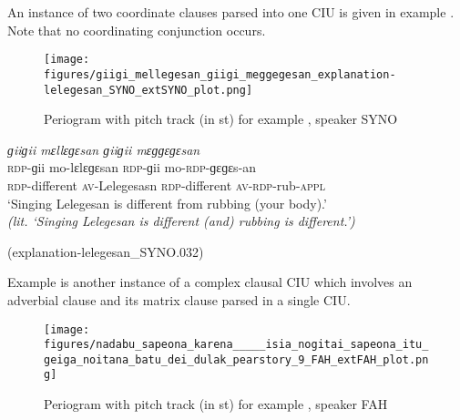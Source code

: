 \z


An instance of  two coordinate clauses parsed into one CIU is given in example  . Note that no coordinating conjunction occurs. 

\begin{figure}
	\texttt{[image: figures/giigi\_mellegesan\_giigi\_meggegesan\_explanation-lelegesan\_SYNO\_extSYNO\_plot.png]}
	\caption{Periogram with pitch track (in st) for example , speaker SYNO}
	\label{pitch:giigii mellegesan giigii meggegesan}
\end{figure}



\ea
\label{ex:giigii mellegesan giigii meggegesan}
\textit{ɡiiɡii mɛllɛɡɛsan ɡiiɡii mɛɡɡɛɡɛsan} \\
\gll \textsc{rdp}-ɡii mo-lɛlɛɡɛsan \textsc{rdp}-ɡii mo-\textsc{rdp}-ɡɛɡɛs-an\\ 
\textsc{rdp}-different \textsc{av}-Lelegesasn \textsc{rdp}-different \textsc{av}-\textsc{rdp}-rub-\textsc{appl}\\
\glt ‘Singing Lelegesan is different from rubbing (your body).’ \\ \textit{(lit. ‘Singing Lelegesan is different (and) rubbing  is different.')} \begin{flushright}(explanation-lelegesan\_SYNO.032)
	\end{flushright}
\z


Example  is another instance of a complex clausal CIU which involves an adverbial clause  and its matrix clause parsed in a single CIU. 

\begin{figure}
	\texttt{[image: figures/nadabu\_sapeona\_karena\_\_\_\_\_isia\_nogitai\_sapeona\_itu\_geiga\_noitana\_batu\_dei\_dulak\_pearstory\_9\_FAH\_extFAH\_plot.png]}
	\caption{Periogram with pitch track (in st) for example , speaker FAH}
	\label{pitch:AdvCl + Simple Cl}
\end{figure}



\ea
\label{ex:AdvCl + Simple Cl}

